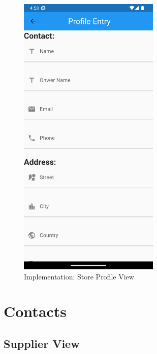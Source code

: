 \documentclass[../thesis.tex]{subfiles}
\begin{document}
\begin{figure}[H]
    \centering
    \includegraphics[width=0.60\textwidth]{images/StoreProfileScreen.png}
    \caption{Implementation: Store Profile View}
    \label{fig:StoreProfileScreen}
\end{figure}

\section{Contacts}
\subsection{Supplier View}
\end{document}
